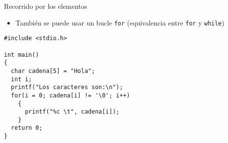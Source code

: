 \documentclass[xcolor={usenames,svgnames,dvipsnames}, aspectratio=169]{beamer}
\begin{document}
\begin{frame}[label={sec:org2e3fe76},fragile]{Recorrido por los elementos}
 \begin{itemize}
\item También se puede usar un bucle \texttt{for} (equivalencia entre \texttt{for} y \texttt{while})
\end{itemize}

\lstset{language=C,label= ,caption= ,captionpos=b,numbers=none}
\begin{lstlisting}
#include <stdio.h>

int main()
{
  char cadena[5] = "Hola";
  int i;
  printf("Los caracteres son:\n");
  for(i = 0; cadena[i] != '\0'; i++)
    {
      printf("%c \t", cadena[i]);
    }
  return 0;
}
\end{lstlisting}
\end{frame}
\end{document}
